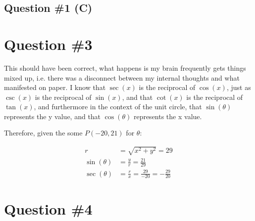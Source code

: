 

\subsection*{Question \#1 (C)}

\section*{Question \#3}

This should have been correct, what happens is my brain frequently gets things mixed up, i.e. there was a disconnect between my internal thoughts and what manifested on paper. I know that $\sec(x)$ is the reciprocal of $\cos(x)$, just as $\csc(x)$ is the reciprocal of $\sin(x)$, and that $\cot(x)$ is the reciprocal of $\tan(x)$, and furthermore in the context of the unit circle, that $\sin(\theta)$ represents the y value, and that $\cos(\theta)$ represents the x value. 

Therefore, given the some $P(-20, 21)$ for $\theta$:

\begin{equation}
\begin{split}
r &= \sqrt{x^2 + y^2} = 29 \\
\sin(\theta) &= \frac{y}{r} = \frac{21}{29} \\
\sec(\theta) &= \frac{r}{x} = \frac{29}{-20} = -\frac{29}{20}
\end{split}
\end{equation}

    

\newpage
\section*{Question \#4}



